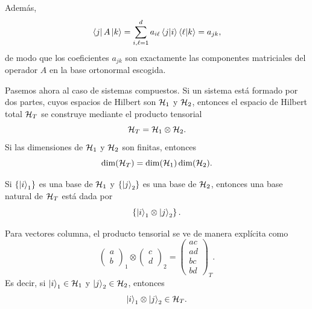 \documentclass[../main.tex]{subfiles}
\begin{document}
Además,
\begin{equation*}
    \bra{j}A\ket{k}
    =
    \sum_{i,\ell=1}^{d}
    a_{i\ell}\braket{j|i}\braket{\ell|k}
    =
    a_{jk},
\end{equation*}
de modo que los coeficientes $a_{jk}$ son exactamente las componentes matriciales del operador $A$ en la base ortonormal escogida.

Pasemos ahora al caso de sistemas compuestos. Si un sistema está formado por dos partes, cuyos espacios de Hilbert son $\mathcal{H}_1$ y $\mathcal{H}_2$, entonces el espacio de Hilbert total $\mathcal{H}_T$ se construye mediante el producto tensorial
\begin{equation*}
    \mathcal{H}_T=\mathcal{H}_1\otimes\mathcal{H}_2.
\end{equation*}
Si las dimensiones de $\mathcal{H}_1$ y $\mathcal{H}_2$ son finitas, entonces
\begin{equation*}
    \dim(\mathcal{H}_T)=\dim(\mathcal{H}_1)\dim(\mathcal{H}_2).
\end{equation*}

Si $\left\{\ket{i}_1\right\}$ es una base de $\mathcal{H}_1$ y $\left\{\ket{j}_2\right\}$ es una base de $\mathcal{H}_2$, entonces una base natural de $\mathcal{H}_T$ está dada por
\begin{equation*}
    \left\{\ket{i}_1\otimes\ket{j}_2\right\}.
\end{equation*}

Para vectores columna, el producto tensorial se ve de manera explícita como
\begin{equation*}
    \begin{pmatrix}
        a\\
        b
    \end{pmatrix}_1
    \otimes
    \begin{pmatrix}
        c\\
        d
    \end{pmatrix}_2
    =
    \begin{pmatrix}
        ac\\
        ad\\
        bc\\
        bd
    \end{pmatrix}_T.
\end{equation*}
Es decir, si $\ket{i}_1\in\mathcal{H}_1$ y $\ket{j}_2\in\mathcal{H}_2$, entonces
\begin{equation*}
    \ket{i}_1\otimes\ket{j}_2\in\mathcal{H}_T.
\end{equation*}
\end{document}
